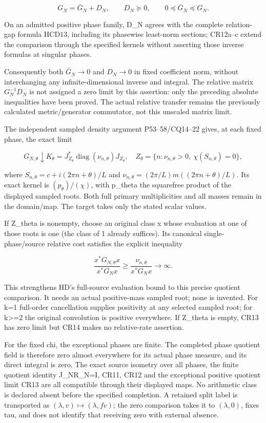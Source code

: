 \[
G_N=\bar G_N+D_N,\qquad D_N\succeq0,
\qquad 0\preceq\bar G_N\preceq G_N.
\tag{CR12}
\]

On an admitted positive phase family, D\_N agrees with the complete relation-gap formula HCD13, including its phasewise least-norm sections; CR12a--c extend the comparison through the specified kernels without asserting those inverse formulas at singular phases.

Consequently both \(\bar G_N\to0\) and \(D_N\to0\) in fixed coefficient norm, without interchanging any infinite-dimensional inverse and integral. The relative matrix \(G_N^{-1}D_N\) is not assigned a zero limit by this assertion: only the preceding absolute inequalities have been proved. The actual relative transfer remains the previously calculated metric/generator commutator, not this unscaled matrix limit.

The independent sampled density argument P53--58/CQ14--22 gives, at each fixed phase, the exact limit

\[
G_{N,\theta}\downarrow K_\theta
=J_{Z_\theta}^*\operatorname{diag}(\nu_{n,\theta})J_{Z_\theta},
\quad Z_\theta=\{n:\nu_{n,\theta}>0,\ \chi(S_{n,\theta})=0\},
\tag{CR13}
\]

where \(S_{n,\theta}=c+i(2\pi n+\theta)/L\) and \(\nu_{n,\theta}=(2\pi/L)m((2\pi n+\theta)/L)\). Its exact kernel is \((p_\theta)/(\chi)\), with p\_theta the squarefree product of the displayed sampled roots. Both full primary multiplicities and all masses remain in the domain/map. The target takes only the stated scalar values.

If Z\_theta is nonempty, choose an original class x whose evaluation at one of those roots is one (the class of 1 already suffices). Its canonical single-phase/source relative cost satisfies the explicit inequality

\[
\frac{x^*G_{N,\theta}x}{x^*G_Nx}
\ge\frac{\nu_{n,\theta}}{x^*G_Nx}\longrightarrow\infty.
\tag{CR14}
\]

This strengthens HD's full-source evaluation bound to this precise quotient comparison. It needs an actual positive-mass sampled root; none is invented. For k=1 full-order cancellation supplies positivity at any selected sampled root; for k\textgreater=2 the original convolution is positive everywhere. If Z\_theta is empty, CR13 has zero limit but CR14 makes no relative-rate assertion.

For the fixed chi, the exceptional phases are finite. The completed phase quotient field is therefore zero almost everywhere for its actual phase measure, and its direct integral is zero. The exact source isometry over all phases, the finite quotient identity J\_NR\_N=I, CR11, CR12 and the exceptional positive quotient limit CR13 are all compatible through their displayed maps. No arithmetic class is declared absent before the specified completion. A retained split label is transported as \((\lambda,v)\mapsto(\lambda,fv)\); the zero comparison takes it to \((\lambda,0)\), fixes tau, and does not identify that receiving zero with external absence.

